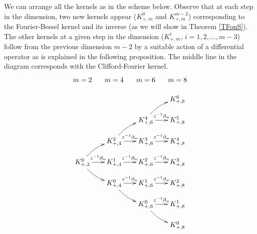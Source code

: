 \documentclass{amsart}
\theoremstyle{remark}
\begin{document}
We can arrange all the kernels as in the scheme below. Observe that at each step in the dimension, two new kernels appear ($K_{+,m}^0$ and $K_{+,m}^{m-2}$) corresponding to the Fourier-Bessel kernel and its inverse (as we will show in Theorem \ref{TFonS}). The other kernels at a given step in the dimension ($K_{+,m}^i$, $i=1,2,\ldots,m-3$) follow from the previous dimension $m-2$ by a suitable action of a differential operator as is explained in the following proposition. The middle line in the diagram corresponds with the Clifford-Fourier kernel.
\[
\xymatrix@=12pt{m=2&m=4&m=6&m=8\\
&&&K_{+,8}^{6}\\
&&K_{+,6}^{4}\ar@/^/[ur] \ar[r]^-{z^{-1}\partial_{w}}&K_{+,8}^{5}\\
&K_{+,4}^{2} \ar@/^/[ur]\ar[r]^-{z^{-1}\partial_{w}}&K_{+,6}^{3}\ar[r]^-{z^{-1}\partial_{w}}&K_{+,8}^{4}\\
K_{+,2}^{0} \ar@/^/[ur] \ar@/_/[dr] \ar[r]^-{z^{-1}\partial_{w}}&K_{+,4}^{1} \ar[r]^-{z^{-1}\partial_{w}}&K_{+,6}^{2} \ar[r]^-{z^{-1}\partial_{w}}&K_{+,8}^{3}\\
&K_{+,4}^{0} \ar@/_/[dr] \ar[r]^-{z^{-1}\partial_{w}}&K_{+,6}^{1}\ar[r]^-{z^{-1}\partial_{w}}&K_{+,8}^{2}\\
&&K_{+,6}^{0} \ar@/_/[dr] \ar[r]^-{z^{-1}\partial_{w}}&K_{+,8}^{1}\\
&&&K_{+,8}^{0}
}
\]
\end{document}
